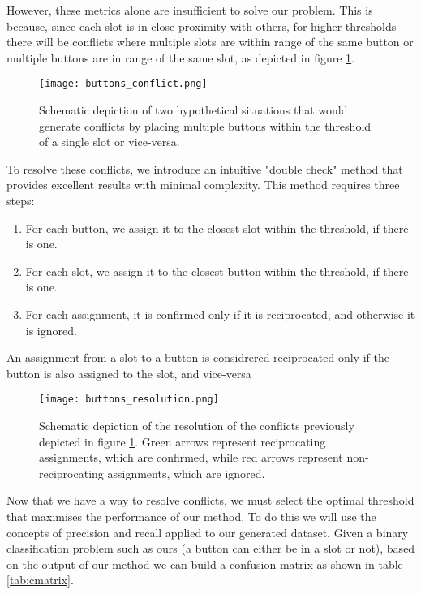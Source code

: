 However, these metrics alone are insufficient to solve our problem. This is because, since each slot is in close proximity with others, for higher thresholds there will be conflicts where multiple slots are within range of the same button or multiple buttons are in range of the same slot, as depicted in figure \ref{fig:conflicts}.

\begin{figure}[ht]
    \texttt{[image: buttons\_conflict.png]}
    \caption{Schematic depiction of two hypothetical situations that would generate conflicts by placing multiple buttons within the threshold of a single slot or vice-versa.}
    \label{fig:conflicts}
\end{figure}

To resolve these conflicts, we introduce an intuitive "double check" method that provides excellent results with minimal complexity. This method requires three steps:

\begin{enumerate}
    \item For each button, we assign it to the closest slot within the threshold, if there is one.
    \item For each slot, we assign it to the closest button within the threshold, if there is one.
    \item For each assignment, it is confirmed only if it is reciprocated, and otherwise it is ignored.
\end{enumerate}

An assignment from a slot to a button is considrered reciprocated only if the button is also assigned to the slot, and vice-versa

\begin{figure}[ht]
    \texttt{[image: buttons\_resolution.png]}
    \caption{Schematic depiction of the resolution of the conflicts previously depicted in figure \ref{fig:conflicts}. Green arrows represent reciprocating assignments, which are confirmed, while red arrows represent non-reciprocating assignments, which are ignored.}
    \label{fig:resolution}
\end{figure}

Now that we have a way to resolve conflicts, we must select the optimal threshold that maximises the performance of our method. To do this we will use the concepts of precision and recall applied to our generated dataset. Given a binary classification problem such as ours (a button can either be in a slot or not), based on the output of our method we can build a confusion matrix as shown in table \ref{tab:cmatrix}.

